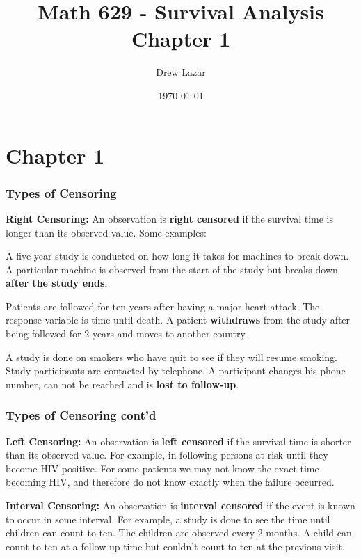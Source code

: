 \documentclass{beamer}
\title{Math 629 - Survival Analysis \\ Chapter 1}
\author{Drew Lazar}
\institute{Ball State University}
\date{\today}
\theoremstyle{definition}
\begin{document}
\begin{frame}
    \titlepage
\end{frame}
\section{Chapter 1}
\begin{frame}\frametitle{Types of Censoring}
\bn
\item \textbf{Right Censoring:} An observation is \textbf{right censored} if the survival time is longer than its observed value. Some examples:
\bni
\item A five year study is conducted on how long it takes for machines to break down. A particular machine is observed from the start of the study but breaks down \textbf{after the study ends}.
\item Patients are followed for ten years after having a major heart attack. The response variable is time until death. A patient \textbf{withdraws} from the study after being followed for 2 years and moves to another country.
\item A study is done on smokers who have quit to see if they will resume smoking. Study participants are contacted by telephone. A participant changes his phone number, can not be reached and is \textbf{lost to follow-up}.
\en
\en
\end{frame}
\begin{frame} \frametitle{Types of Censoring cont'd}

\bn \setcounter{enumi}{2}
\item \textbf{Left Censoring:} An observation is \textbf{left censored} if the survival time is shorter than its observed value. For example, in following persons at risk until they become HIV positive.  For some patients we may not know the exact time becoming HIV, and therefore do not know exactly when the failure occurred.
\item \textbf{Interval Censoring:} An observation is \textbf{interval censored} if the event is known to occur in some interval. For example, a study is done to see the time until children can count to ten. The children are observed every 2 months. A child can count to ten at a follow-up time but couldn't count to ten at the previous visit.
\en
\end{frame}
\end{document}
